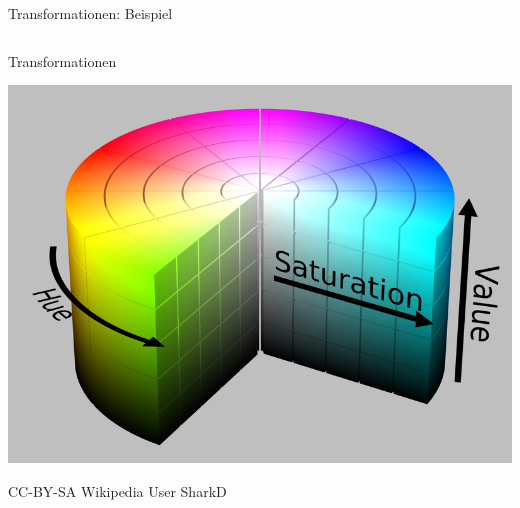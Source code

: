 \documentclass{beamer}
\theoremstyle{example}
\begin{document}
\begin{frame}[fragile]{Transformationen: Beispiel}
\begin{columns}
\begin{center}
    \end{center}
    \column{3cm}
    
    \begin{center}
    \end{center}
  \end{columns}

\end{frame}

\begin{frame}{Transformationen}
\begin{center}
\includegraphics[width=0.7\linewidth]{./images/HSV.png}
\end{center}
\hfill{{\tiny CC-BY-SA Wikipedia User SharkD}}
\end{frame}
\end{document}
